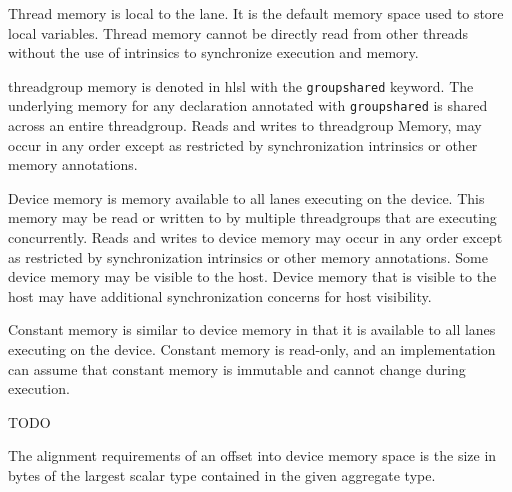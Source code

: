 
\p Thread memory is local to the \gls{lane}. It is the default memory space used to
store local variables. Thread memory cannot be directly read from other threads
without the use of intrinsics to synchronize execution and memory.


\p \gls{threadgroup} memory is denoted in \acrshort{hlsl} with the
\texttt{groupshared} keyword. The underlying memory for any declaration
annotated with \texttt{groupshared} is shared across an entire
\gls{threadgroup}. Reads and writes to \gls{threadgroup} Memory, may occur in
any order except as restricted by synchronization intrinsics or other memory
annotations.


\p Device memory is memory available to all \gls{lane}s executing on the device.
This memory may be read or written to by multiple \gls{threadgroup}s that are
executing concurrently. Reads and writes to device memory may occur in any order
except as restricted by synchronization intrinsics or other memory annotations.
Some device memory may be visible to the host. Device memory that is visible to
the host may have additional synchronization concerns for host visibility.


\p Constant memory is similar to device memory in that it is available to all
\gls{lane}s executing on the device. Constant memory is read-only, and an
implementation can assume that constant memory is immutable and cannot change
during execution.


TODO

\p The alignment requirements of an offset into device memory space is the size
 in bytes of the largest scalar type contained in the given aggregate type.

